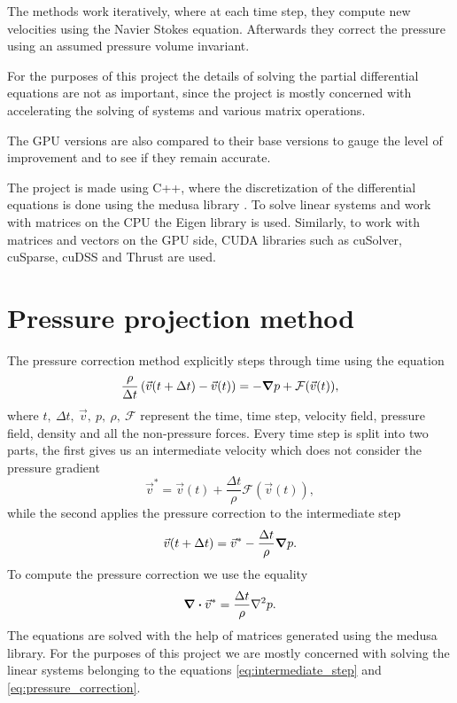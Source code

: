 \documentclass{article}
\begin{document}
The methods work iteratively, where at each time step, they compute new velocities using the 
Navier Stokes equation. Afterwards they correct the pressure using an assumed pressure volume 
invariant. 

For the purposes of this project the details of solving the partial differential equations are not 
as important, since the project is mostly concerned with accelerating the solving of systems and 
various matrix operations.

The GPU versions are also compared to their base versions to gauge the level of improvement and to 
see if they remain accurate.

The project is made using C++, where the discretization of the differential equations is done using 
the medusa library \cite{medusa}. To solve linear systems and work with matrices on the CPU the 
Eigen library is used. Similarly, to work with matrices and vectors on the GPU side, 
CUDA libraries such as cuSolver, cuSparse, cuDSS and Thrust are used.
\section{Pressure projection method}
The pressure correction method explicitly steps through time using the equation 
\begin{equation}
    \frac{\rho}{\Delta t} \left( \vec{v}(t + \Delta t) - \vec{v}(t)
    \right) =
    -\grad p + \mathcal{F}(\vec{v}(t)),
\end{equation}
where \(t,~\Delta t,~\vec{v},~p,~\rho,~\mathcal{F}\) represent the time, time step, velocity 
field, pressure field, density and all the non-pressure forces. 
Every time step is split into two parts, the first gives us an intermediate velocity
which does not consider the pressure gradient
\begin{equation}
    \label{eq:intermediate_step}
    \vec{v}^* = \vec{v}(t) + \frac{\Delta t}{\rho}
        \mathcal{F}(\vec{v}(t)),
\end{equation}
while the second applies the pressure correction to the intermediate step
\begin{equation}
    \vec{v}(t + \Delta t) = \vec{v}^* -\frac{\Delta t}{\rho} \grad p.
\end{equation}
To compute the pressure correction we use the equality
\begin{equation}
    \label{eq:pressure_correction}
    \div \vec{v}^*
        = \frac{\Delta t}{\rho}\laplacian p.
\end{equation}
The equations are solved with the help of matrices generated using the medusa library.
For the purposes of this project we are mostly concerned with solving the linear 
systems belonging to the equations \ref{eq:intermediate_step} and \ref{eq:pressure_correction}.
\end{document}

